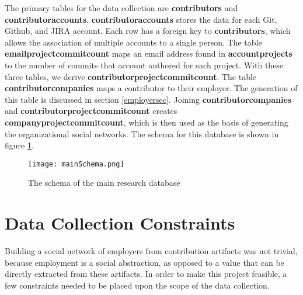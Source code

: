 The primary tables for the data collection are \textbf{contributors} and \textbf{contributoraccounts}. \textbf{contributoraccounts} stores the data for each Git, Github, and JIRA account. Each row has a foreign key to \textbf{contributors}, which allows the association of multiple accounts to a single person. The table \textbf{emailprojectcommitcount} maps an email address found in \textbf{accountprojects} to the number of commits that account authored for each project. With these three tables, we derive \textbf{contributorprojectcommitcount}. The table \textbf{contributorcompanies} maps a contributor to their employer. The generation of this table is discussed in section \ref{employersec}. Joining \textbf{contributorcompanies} and \textbf{contributorprojectcommitcount} creates \textbf{companyprojectcommitcount}, which is then used as the basis of generating the organizational social networks. The schema for this database is shown in figure \ref{fig:mainSchema}.
\begin{figure}
	\texttt{[image: mainSchema.png]}
	\centering
	\caption{The schema of the main research database}
	\label{fig:mainSchema}
\end{figure}

\section{Data Collection Constraints}
Building a social network of employers from contribution artifacts was not trivial, because employment is a social abstraction, as opposed to a value that can be directly extracted from these artifacts. In order to make this project feasible, a few constraints needed to be placed upon the scope of the data collection.

